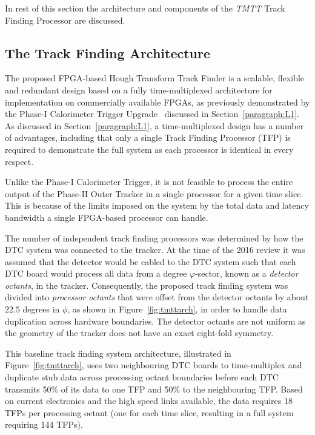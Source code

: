 In rest of this section the architecture and components of the \emph{TMTT} Track Finding Processor are discussed. 

\subsection{The Track Finding Architecture}\label{subsec:TFA}
The proposed FPGA-based Hough Transform Track Finder is a scalable, flexible and redundant design based on a fully time-multiplexed architecture for implementation on commercially available FPGAs, as previously demonstrated by the Phase-I Calorimeter Trigger Upgrade~\cite{Tapper:2013yva} discussed in Section~\ref{paragraph:L1}.
As discussed in Section~\ref{paragraph:L1}, a time-multiplexed design has a number of advantages, including that only a single Track Finding Processor (TFP) is required to demonstrate the full system as each processor is identical in every respect.

Unlike the Phase-I Calorimeter Trigger, it is not feasible to process the entire output of the Phase-II Outer Tracker in a single processor for a given time slice.
This is because of the limits imposed on the system by the total data and latency bandwidth a single FPGA-based processor can handle.

The number of independent track finding processors was determined by how the DTC system was connected to the tracker.
At the time of the 2016 review it was assumed that the detector would be cabled to the DTC system such that each DTC board would process all data from a  degree $\varphi$-sector, known as a \emph{detector octants}, in the tracker.
Consequently, the proposed track finding system was divided into \emph{processor octants} that were offset from the detector octants by about $22.5$ degrees in $\phi$, as shown in Figure~\ref{fig:tmttarch}, in order to handle data duplication across hardware boundaries.
The detector octants are not uniform as the geometry of the tracker does not have an exact eight-fold symmetry.

This baseline track finding system architecture, illustrated in Figure~\ref{fig:tmttarch}, uses two neighbouring DTC boards to time-multiplex and duplicate stub data across processing octant boundaries before each DTC transmits 50\% of its data to one TFP and 50\% to the neighbouring TFP.
Based on current electronics and the high speed links available, the data requires 18 TFPs per processing octant (one for each time slice, resulting in a full system requiring 144 TFPs).


